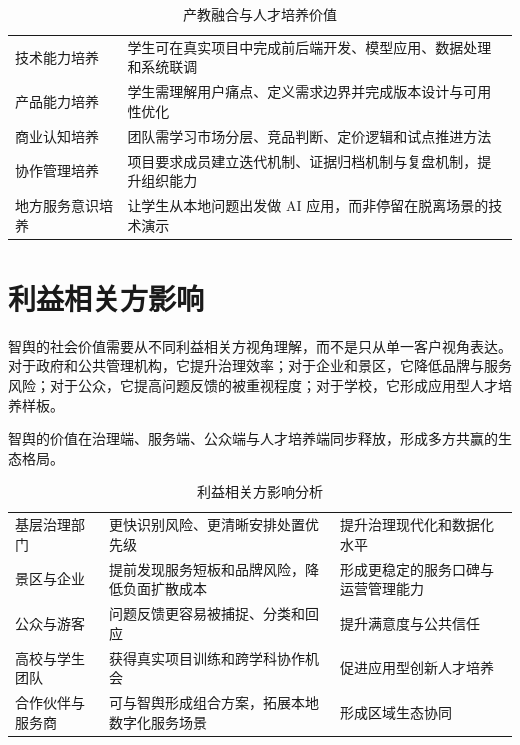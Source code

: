 \begin{table}[htbp]
	\centering
	\caption{产教融合与人才培养价值}
	\begin{tabularx}{\textwidth}{L{3cm}Y}
		\toprule
		 &                    \\
		\midrule
		技术能力培养         & 学生可在真实项目中完成前后端开发、模型应用、数据处理和系统联调  \\
		产品能力培养         & 学生需理解用户痛点、定义需求边界并完成版本设计与可用性优化    \\
		商业认知培养         & 团队需学习市场分层、竞品判断、定价逻辑和试点推进方法       \\
		协作管理培养         & 项目要求成员建立迭代机制、证据归档机制与复盘机制，提升组织能力  \\
		地方服务意识培养       & 让学生从本地问题出发做 AI 应用，而非停留在脱离场景的技术演示 \\
		\bottomrule
	\end{tabularx}
\end{table}

\section{利益相关方影响}

智舆的社会价值需要从不同利益相关方视角理解，而不是只从单一客户视角表达。对于政府和公共管理机构，它提升治理效率；对于企业和景区，它降低品牌与服务风险；对于公众，它提高问题反馈的被重视程度；对于学校，它形成应用型人才培养样板。


智舆的价值在治理端、服务端、公众端与人才培养端同步释放，形成多方共赢的生态格局。


\begin{table}[htbp]
	\centering
	\caption{利益相关方影响分析}
	\begin{tabularx}{\textwidth}{L{3cm}YL{2.8cm}}
		\toprule
		 &          &  \\
		\midrule
		基层治理部门          & 更快识别风险、更清晰安排处置优先级      & 提升治理现代化和数据化水平     \\
		景区与企业           & 提前发现服务短板和品牌风险，降低负面扩散成本 & 形成更稳定的服务口碑与运营管理能力 \\
		公众与游客           & 问题反馈更容易被捕捉、分类和回应       & 提升满意度与公共信任        \\
		高校与学生团队         & 获得真实项目训练和跨学科协作机会       & 促进应用型创新人才培养       \\
		合作伙伴与服务商        & 可与智舆形成组合方案，拓展本地数字化服务场景 & 形成区域生态协同          \\
		\bottomrule
	\end{tabularx}
\end{table}

